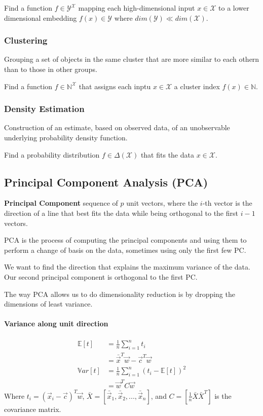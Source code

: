 \documentclass[a4paper,6pt,twocolumn,fleqn]{article}
\begin{document}
Find a function \(f \in \mathcal Y^{\mathcal X}\) mapping each high-dimensional input \(x \in \mathcal X\) to a lower dimensional embedding \(f(x) \in \mathcal Y\) where \(dim(\mathcal Y) \ll dim(\mathcal X)\).
\subsubsection{Clustering} %
Grouping a set of objects in the same cluster that are more similar to each othern than to those in other groups.

Find a function \(f \in \mathbb N^{\mathcal X}\) that assigns each inptu \(x \in \mathcal X\) a cluster index \(f(x) \in \mathbb N\).
\subsubsection{Density Estimation} %
Construction of an estimate, based on observed data, of an unobservable underlying probability density function.

Find a probability distribution \(f \in \Delta(\mathcal X)\) that fits the data \(x \in \mathcal X\).
\subsection{Principal Component Analysis (PCA)} %
\textbf{Principal Component} sequence of \(p\) unit vectors, where the \(i\)-th vector is the direction of a line that best fits the data while being orthogonal to the first \(i-1\) vectors.

PCA is the process of computing the principal components and using them to perform a change of basis on the data, sometimes using only the first few PC.

We want to find the direction that explains the maximum variance of the data. Our second principal component is orthogonal to the first PC.

The way PCA allows us to do dimensionality reduction is by dropping the dimensions of least variance.

\paragraph{Variance along unit direction}
\begin{align}
    \mathbb E[t] & = \frac 1 n \sum_{i=1}^n t_i\\
    & = \bar{\vec x}^T \vec w - \vec c^T \vec w\\
    \mathbb Var[t] & = \frac 1 n \sum_{i=1}^n (t_i - \mathbb E[t])^2\\
    & = \vec w^T C \vec w
\end{align}
Where \(t_i = (\vec{x}_i - \vec{c})^T \vec{w}\), \(\bar{X} = [\bar{\vec{x}}_1, \bar{\vec{x}}_2, ..., \bar{\vec{x}}_n]\), and \(C = \left[ \frac 1 n \bar{X}\bar{X}^T \right]\) is the covariance matrix.
\end{document}
